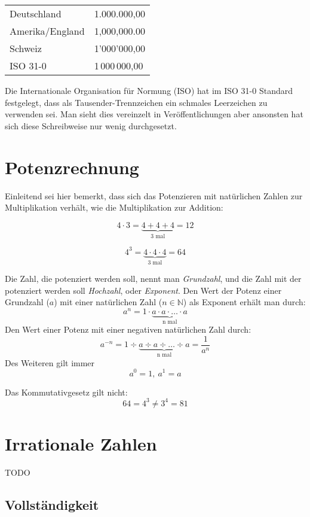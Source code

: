 \bigskip

\begin{tabular}{L{4cm}R{4cm}}
Deutschland & 1.000.000,00 \\
Amerika/England & 1,000,000.00 \\
Schweiz & 1'000'000,00 \\
ISO 31-0 & 1\,000\,000,00
\end{tabular}

\bigskip

Die Internationale Organisation für Normung (ISO) hat im ISO 31-0 Standard festgelegt, dass als Tausender-Trennzeichen ein schmales Leerzeichen zu verwenden sei. Man sieht dies vereinzelt in Veröffentlichungen aber ansonsten hat sich diese Schreibweise nur wenig durchgesetzt. 

\section{Potenzrechnung}

Einleitend sei hier bemerkt, dass sich das Potenzieren mit natürlichen Zahlen zur Multiplikation verhält, wie die Multiplikation zur Addition:

\[ 4\cdot 3 = \underbrace{4+4+4}_{\text{3 mal}} = 12 \]

\[ 4^3 = \underbrace{4\cdot 4\cdot 4}_{\text{3 mal}} = 64 \]

\begin{definition}
Die Zahl, die potenziert werden soll, nennt man \textsl{Grundzahl}, und die Zahl mit der potenziert werden soll \textsl{Hochzahl}, oder \textsl{Exponent}. Den Wert der Potenz einer Grundzahl ($a$) mit einer natürlichen Zahl ($n \in \mathbb{N}$) als Exponent erhält man durch:
\[ a^n = 1\cdot \underbrace{a\cdot a \cdot \dots \cdot a}_{\text{n mal}} \]
Den Wert einer Potenz mit einer negativen natürlichen Zahl durch:
\[ a^{-n} = 1 \div \underbrace{a\div a \div \dots \div a}_{\text{n mal}} = \frac{1}{a^n} \]
Des Weiteren gilt immer
\[ a^0 = 1,\ a^1=a \]
\end{definition}
Das Kommutativgesetz gilt nicht:
\[ 64 = 4^3 \ne 3^4 = 81 \]


\section{Irrationale Zahlen}

TODO


\subsection{Vollständigkeit}

